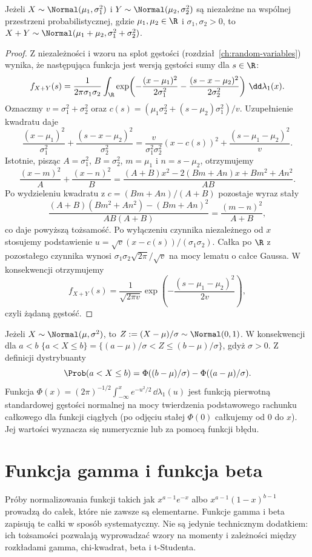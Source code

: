 \begin{stwierdzenie}
Jeżeli $X\sim\Normal(\mu_1,\sigma_1^2)$ i
$Y\sim\Normal(\mu_2,\sigma_2^2)$ są niezależne na
wspólnej przestrzeni probabilistycznej, gdzie
$\mu_1,\mu_2\in\R$ i $\sigma_1,\sigma_2>0$, to
$X+Y\sim\Normal(\mu_1+\mu_2,\sigma_1^2+\sigma_2^2)$.
\end{stwierdzenie}
\begin{proof}
Z niezależności i wzoru na splot gęstości
(rozdział~\ref{ch:random-variables}) wynika, że następująca
funkcja jest wersją gęstości sumy dla $s\in\R$:
\[
f_{X+Y}(s)=\frac1{2\pi\sigma_1\sigma_2}
\int_\R\exp\!\left(-\frac{(x-\mu_1)^2}{2\sigma_1^2}
-\frac{(s-x-\mu_2)^2}{2\sigma_2^2}\right)\,\dd\lambda_1(x).
\]
Oznaczmy $v=\sigma_1^2+\sigma_2^2$ oraz
$c(s)=(\mu_1\sigma_2^2+(s-\mu_2)\sigma_1^2)/v$.
Uzupełnienie kwadratu daje
\[
\frac{(x-\mu_1)^2}{\sigma_1^2}
+\frac{(s-x-\mu_2)^2}{\sigma_2^2}
=\frac{v}{\sigma_1^2\sigma_2^2}(x-c(s))^2
+\frac{(s-\mu_1-\mu_2)^2}{v}.
\]
Istotnie, pisząc $A=\sigma_1^2$, $B=\sigma_2^2$,
$m=\mu_1$ i $n=s-\mu_2$, otrzymujemy
\[
\frac{(x-m)^2}{A}+\frac{(x-n)^2}{B}
=\frac{(A+B)x^2-2(Bm+An)x+Bm^2+An^2}{AB}.
\]
Po wydzieleniu kwadratu z $c=(Bm+An)/(A+B)$
pozostaje wyraz stały
\[
\frac{(A+B)(Bm^2+An^2)-(Bm+An)^2}{AB(A+B)}
=\frac{(m-n)^2}{A+B},
\]
co daje powyższą tożsamość.
Po wyłączeniu czynnika niezależnego od $x$ stosujemy
podstawienie $u=\sqrt v(x-c(s))/(\sigma_1\sigma_2)$.
Całka po $\R$ z pozostałego czynnika wynosi
$\sigma_1\sigma_2\sqrt{2\pi}/\sqrt v$ na mocy lematu
o całce Gaussa. W konsekwencji otrzymujemy
\[
f_{X+Y}(s)=\frac{1}{\sqrt{2\pi v}}
\exp\!\left(-\frac{(s-\mu_1-\mu_2)^2}{2v}\right),
\]
czyli żądaną gęstość.
\end{proof}

\begin{przyklad}[Standaryzacja]
Jeżeli $X\sim\Normal(\mu,\sigma^2)$, to
$Z:=(X-\mu)/\sigma\sim\Normal(0,1)$.
W konsekwencji dla $a<b$
$\{a<X\leq b\}=\{(a-\mu)/\sigma<Z\leq(b-\mu)/\sigma\}$,
gdyż $\sigma>0$. Z definicji dystrybuanty
\[
\Prob(a<X\leq b)=\Phi((b-\mu)/\sigma)-\Phi((a-\mu)/\sigma).
\]
Funkcja $\Phi(x)=(2\pi)^{-1/2}\int_{-\infty}^x
e^{-u^2/2}\,\dd\lambda_1(u)$ jest funkcją pierwotną
standardowej gęstości normalnej na mocy twierdzenia
podstawowego rachunku całkowego dla funkcji ciągłych
(po odjęciu stałej $\Phi(0)$ całkujemy od $0$ do $x$). Jej wartości wyznacza
się numerycznie lub za pomocą funkcji błędu.
\end{przyklad}

\section{Funkcja gamma i funkcja beta}
Próby normalizowania funkcji takich jak
$x^{a-1}e^{-x}$ albo $x^{a-1}(1-x)^{b-1}$ prowadzą
do całek, które nie zawsze są elementarne. Funkcje gamma i beta
zapisują te całki w sposób systematyczny. Nie są jedynie
technicznym dodatkiem: ich tożsamości pozwalają wyprowadzać
wzory na momenty i zależności między rozkładami gamma,
chi-kwadrat, beta i t-Studenta.

